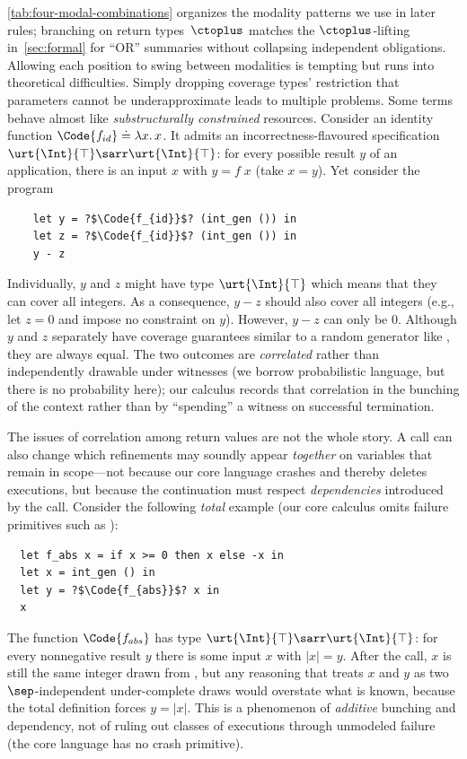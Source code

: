 \autoref{tab:four-modal-combinations} organizes the modality patterns we use in later rules; branching on return types~\(\ctoplus\) matches the \(\ctoplus\)-lifting in~\autoref{sec:formal} for ``OR'' summaries without collapsing independent obligations.
Allowing each position to swing between modalities is tempting but runs into theoretical difficulties.
Simply dropping coverage types' restriction that parameters cannot be
underapproximate leads to multiple problems.
Some terms behave almost like \emph{substructurally constrained} resources.
Consider an identity function $\Code{f_{id}} \doteq \lambda x.\,x$.
It admits an incorrectness-flavoured specification
$\urt{\Int}{\top} \sarr \urt{\Int}{\top}$: for every possible result $y$ of
an application, there is an input $x$ with $y = f\;x$ (take $x = y$).
Yet consider the program
\begin{verbatim}
    let y = ?$\Code{f_{id}}$? (int_gen ()) in
    let z = ?$\Code{f_{id}}$? (int_gen ()) in
    y - z
\end{verbatim}
Individually, $y$ and $z$ might have type
$\urt{\Int}{\top}$ which means that they can cover all integers. As a consequence, $y - z$ should also cover all integers (e.g., let $z = 0$ and impose no constraint on $y$). However,
$y - z$ can only be $0$.
Although $y$ and $z$ separately have coverage guarantees similar to a random generator like , they are always equal.
The two outcomes are \emph{correlated} rather than independently drawable under witnesses (we borrow probabilistic language, but there is no probability here); our calculus records that correlation in the bunching of the context rather than by ``spending'' a witness on successful termination.

The issues of correlation among return values are not the whole story.
A call can also change which refinements may soundly appear \emph{together} on variables that remain in scope---not because our core language crashes and thereby deletes executions, but because the continuation must respect \emph{dependencies} introduced by the call.
Consider the following \emph{total} example (our core calculus omits failure primitives such as ):
\begin{verbatim}
  let f_abs x = if x >= 0 then x else -x in
  let x = int_gen () in
  let y = ?$\Code{f_{abs}}$? x in
  x
\end{verbatim}
The function $\Code{f_{abs}}$ has type
$\urt{\Int}{\top} \sarr \urt{\Int}{\top}$: for every nonnegative result $y$ there is some input $x$ with $|x| = y$.
After the call, $x$ is still the same integer drawn from , but any reasoning that treats $x$ and $y$ as two $\sep$-independent under-complete draws would overstate what is known, because the total definition forces $y = |x|$.
This is a phenomenon of \emph{additive} bunching and dependency, not of ruling out classes of executions through unmodeled failure (the core language has no crash primitive).

